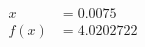 \documentclass[preview]{standalone}
\begin{document}
\begin{align*}
x &= 0.0075\\f(x) &= 4.0202722
\end{align*}
\end{document}
